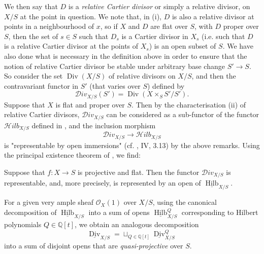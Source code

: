We then say that $D$ is a \emph{relative Cartier divisor} or simply a relative divisor, on $X/S$ at the point in question.
We note that, in (i), $D$ is also a relative divisor at points in a neighbourhood of $x$, so if $X$ and $D$ are flat over $S$, with $D$ proper over $S$, then the set of $s\in S$ such that $D_s$ is a Cartier divisor in $X_s$ (i.e. such that $D$ is a relative Cartier divisor at the points of $X_s$) is an open subset of $S$.
We have also done what is necessary in the definition above in order to ensure that the notion of relative Cartier divisor be stable under arbitrary base change $S'\to S$.
So consider the set $\operatorname{Div}(X/S)$ of relative divisors on $X/S$, and then the contravariant functor in $S'$ (that varies over $S$) defined by
\[
    \mathcal{D}iv_{X/S}(S') = \operatorname{Div}(X\times_S S'/S').
\]
Suppose that $X$ is flat and proper over $S$.
Then by the characterisation (ii) of relative Cartier divisors, $\mathcal{D}iv_{X/S}$ can be considered as a sub-functor of the functor $\mathcal{H}ilb_{X/S}$ defined in , and the inclusion morphism
\[
    \mathcal{D}iv_{X/S} \to \mathcal{H}ilb_{X/S}
\]
is "representable by open immersions" (cf. \cite{Gro1960a}, IV, 3.13) by the above remarks.
Using the principal existence theorem of , we find:

\begin{proposition}\label{fga3.v-4-proposition-4.1}
    Suppose that $f\colon X\to S$ is projective and flat.
    Then the functor $\mathcal{D}iv_{X/S}$ is representable, and, more precisely, is represented by an open of $\underline{\operatorname{Hilb}}_{X/S}$.
\end{proposition}


For a given very ample sheaf $\mathcal{O}_X(1)$ over $X/S$, using the canonical decomposition of $\underline{\operatorname{Hilb}}_{X/S}$ into a sum of opens $\underline{\operatorname{Hilb}}_{X/S}^Q$ corresponding to Hilbert polynomials $Q\in\mathbb{Q}[t]$, we obtain an analogous decomposition
\[
    \underline{\operatorname{Div}}_{X/S}
    = \sqcup_{Q\in\mathbb{Q}[t]} \underline{\operatorname{Div}}_{X/S}^Q
\]
into a sum of disjoint opens that are \emph{quasi-projective} over $S$.

